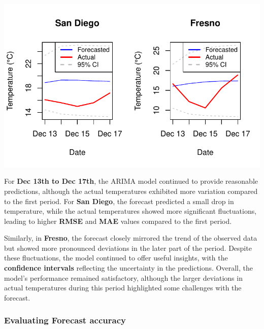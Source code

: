 \documentclass[
  11pt,
]{article}
\begin{document}
\includegraphics{project_files/figure-pdf/unnamed-chunk-92-1.pdf}

For \textbf{Dec 13th to Dec 17th}, the ARIMA model continued to provide
reasonable predictions, although the actual temperatures exhibited more
variation compared to the first period. For \textbf{San Diego}, the
forecast predicted a small drop in temperature, while the actual
temperatures showed more significant fluctuations, leading to higher
\textbf{RMSE} and \textbf{MAE} values compared to the first period.

Similarly, in \textbf{Fresno}, the forecast closely mirrored the trend
of the observed data but showed more pronounced deviations in the later
part of the period. Despite these fluctuations, the model continued to
offer useful insights, with the \textbf{confidence intervals} reflecting
the uncertainty in the predictions. Overall, the model's performance
remained satisfactory, although the larger deviations in actual
temperatures during this period highlighted some challenges with the
forecast.

\subsubsection{Evaluating Forecast
accuracy}\label{evaluating-forecast-accuracy}
\end{document}
